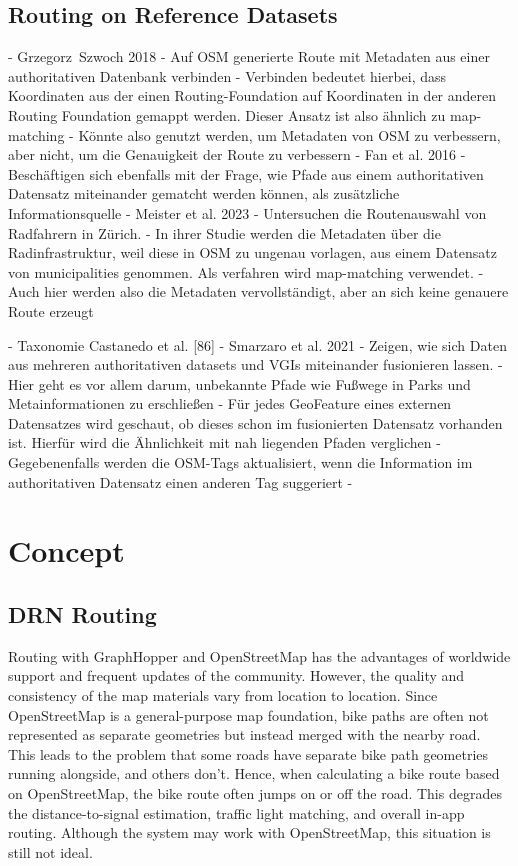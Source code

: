 \subsection{Routing on Reference Datasets}

- Grzegorz Szwoch 2018 \cite{szwoch_combining_2019}
    - Auf OSM generierte Route mit Metadaten aus einer authoritativen Datenbank verbinden
    - Verbinden bedeutet hierbei, dass Koordinaten aus der einen Routing-Foundation auf Koordinaten in der anderen Routing Foundation gemappt werden. Dieser Ansatz ist also ähnlich zu map-matching
    - Könnte also genutzt werden, um Metadaten von OSM zu verbessern, aber nicht, um die Genauigkeit der Route zu verbessern
- Fan et al. 2016 \cite{fan_polygon-based_2016}
    - Beschäftigen sich ebenfalls mit der Frage, wie Pfade aus einem authoritativen Datensatz miteinander gematcht werden können, als zusätzliche Informationsquelle
- Meister et al. 2023 \cite{meister_route_2023}
    - Untersuchen die Routenauswahl von Radfahrern in Zürich.
    - In ihrer Studie werden die Metadaten über die Radinfrastruktur, weil diese in OSM zu ungenau vorlagen, aus einem Datensatz von municipalities genommen. Als verfahren wird map-matching verwendet.
    - Auch hier werden also die Metadaten vervollständigt, aber an sich keine genauere Route erzeugt

- Taxonomie Castanedo et al. [86]
- Smarzaro et al. 2021 \cite{smarzaro_creation_2021}
    - Zeigen, wie sich Daten aus mehreren authoritativen datasets und VGIs miteinander fusionieren lassen.
    - Hier geht es vor allem darum, unbekannte Pfade wie Fußwege in Parks und Metainformationen zu erschließen
    - Für jedes GeoFeature eines externen Datensatzes wird geschaut, ob dieses schon im fusionierten Datensatz vorhanden ist. Hierfür wird die Ähnlichkeit mit nah liegenden Pfaden verglichen
    - Gegebenenfalls werden die OSM-Tags aktualisiert, wenn die Information im authoritativen Datensatz einen anderen Tag suggeriert
    - 
    

\section{Concept}

\subsection{DRN Routing}

Routing with GraphHopper and OpenStreetMap has the advantages of worldwide support and frequent updates of the community. However, the quality and consistency of the map materials vary from location to location. Since OpenStreetMap is a general-purpose map foundation, bike paths are often not represented as separate geometries but instead merged with the nearby road. This leads to the problem that some roads have separate bike path geometries running alongside, and others don't. Hence, when calculating a bike route based on OpenStreetMap, the bike route often jumps on or off the road. This degrades the distance-to-signal estimation, traffic light matching, and overall in-app routing. Although the system may work with OpenStreetMap, this situation is still not ideal.


